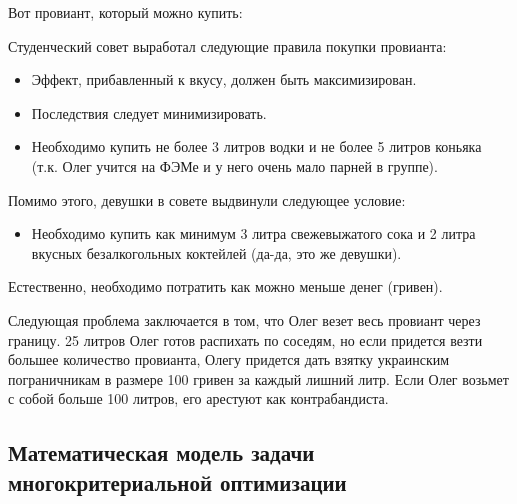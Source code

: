 \documentclass[14pt,a4paper,report]{report}
\begin{document}
Вот провиант, который можно купить:

\begin{table}[]
\end{table}

Студенческий совет выработал следующие правила покупки провианта:

\begin{itemize}
    \item Эффект, прибавленный к вкусу, должен быть максимизирован.
    \item Последствия следует минимизировать.
    \item Необходимо купить не более 3 литров водки и не более 5 литров коньяка (т.к. Олег учится на ФЭМе и у него очень мало парней в группе).
\end{itemize}

Помимо этого, девушки в совете выдвинули следующее условие:

\begin{itemize}
    \item Необходимо купить как минимум 3 литра свежевыжатого сока и 2 литра вкусных безалкогольных коктейлей (да-да, это же девушки).
\end{itemize}
Естественно, необходимо потратить как можно меньше денег (гривен).

Следующая проблема заключается в том, что Олег везет весь провиант через границу. 25 литров Олег готов распихать по соседям, но если придется везти большее количество провианта, Олегу придется дать взятку украинским пограничникам в размере 100 гривен за каждый лишний литр. Если Олег возьмет с собой больше 100 литров, его арестуют как контрабандиста.





\subsection{Математическая модель задачи многокритериальной оптимизации}
\end{document}
